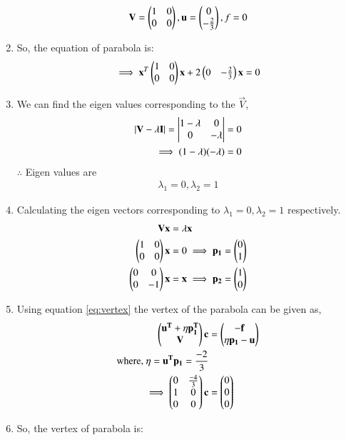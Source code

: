 \documentclass[journal,12pt,twocolumn]{IEEEtran}
\begin{document}
\begin{enumerate}
\begin{align}
\mathbf{V}=\begin{pmatrix}1&0\\0&0\end{pmatrix},\mathbf{u}=\begin{pmatrix}0\\-\frac{2}{3}\end{pmatrix},f=0 \label{eq:v}
\end{align}
\item So, the equation of parabola is:
\begin{align}
\implies \mathbf{x}^T\begin{pmatrix}1&0\\0&0\end{pmatrix}\mathbf{x}+2\begin{pmatrix}0&-\frac{2}{3}\end{pmatrix}\mathbf{x}=0 \label{eq1} 
\end{align}
\item We can find the eigen values corresponding to the $\vec{V}$,
\begin{align}
\lvert\mathbf{V} - \lambda\mathbf{I}\vert = \begin{vmatrix}1-\lambda & 0 \\ 0 & -\lambda\end{vmatrix} &= 0
\\
\implies (1- \lambda)(-\lambda) &= 0
\end{align}
$\therefore$ Eigen values are 
\begin{align}
\lambda_1 = 0 , \lambda_2 = 1
\end{align}
\item Calculating the eigen vectors corresponding to $\lambda_1 = 0 , \lambda_2 = 1$ respectively.
\begin{align}
\mathbf{V}\mathbf{x} &= \lambda\mathbf{x}
\\
\begin{pmatrix}1 & 0 \\ 0 & 0\end{pmatrix}\mathbf{x} &=0 \implies \mathbf{p_1} = \begin{pmatrix}0 \\ 1\end{pmatrix}
\\
\begin{pmatrix}0 & 0 \\ 0 & -1\end{pmatrix}\mathbf{x} &=\mathbf{x}  \implies \mathbf{p_2} = \begin{pmatrix}1 \\ 0\end{pmatrix}
\end{align}
\item Using equation \eqref{eq:vertex} the vertex of the parabola can be given as,
\begin{align} \begin{pmatrix}\mathbf{u^T}+\eta\mathbf{p_1^T}\\\mathbf{V} \end{pmatrix}\mathbf{c} &= \begin{pmatrix}\mathbf{-f}\\\eta \mathbf{p_1} -\mathbf{u}\end{pmatrix}
\\
\text{where, }  \eta = \mathbf{u^T}\mathbf{p_1} = \frac{-2}{3}
\\
\implies\begin{pmatrix}0 & \frac{-4}{3}\\1 & 0 \\0 & 0\end{pmatrix} \mathbf{c}&= \begin{pmatrix}0\\0\\0\end{pmatrix}
\end{align}
\item So, the vertex of parabola is:

\end{enumerate}
\end{document}
